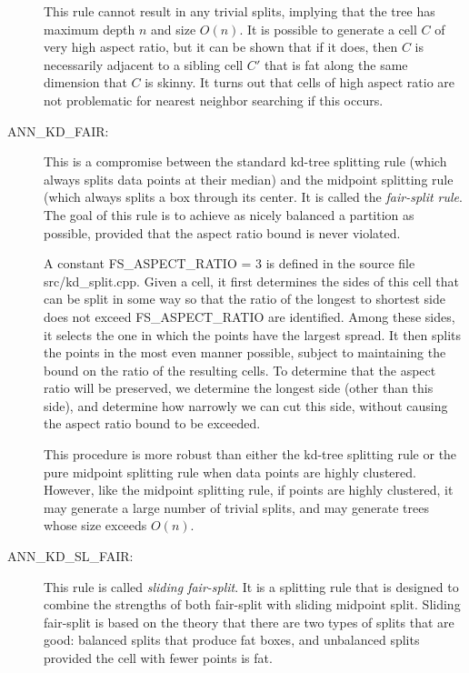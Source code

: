 \documentclass[11pt]{article}		%
\begin{document}
\begin{description}
	This rule cannot result in any trivial splits, implying that the
	tree has maximum depth $n$ and size $O(n)$.  It is possible to
	generate a cell $C$ of very high aspect ratio, but it can be shown
	that if it does, then $C$ is necessarily adjacent to a sibling cell
	$C'$ that is fat along the same dimension that $C$ is skinny.  It
	turns out that cells of high aspect ratio are not problematic for
	nearest neighbor searching if this occurs.

\item[\hbox{\sf ANN\_KD\_FAIR:}]
	This is a compromise between the standard kd-tree
	splitting rule (which always splits data points at their median)
	and the midpoint splitting rule (which always splits a box through
	its center.  It is called the \emph{fair-split rule}.  The goal of
	this rule is to achieve as nicely balanced a partition as possible,
	provided that the aspect ratio bound is never violated.

	A constant \textsf{FS\_ASPECT\_RATIO = 3} is defined in the source
	file \textsf{src/kd\_split.cpp}.  Given a cell, it first determines
	the sides of this cell that can be split in some way so that the
	ratio of the longest to shortest side does not exceed
	\textsf{FS\_ASPECT\_RATIO} are identified.  Among these sides, it
	selects the one in which the points have the largest spread.  It
	then splits the points in the most even manner possible, subject
	to maintaining the bound on the ratio of the resulting cells.  To
	determine that the aspect ratio will be preserved, we determine
	the longest side (other than this side), and determine how narrowly
	we can cut this side, without causing the aspect ratio bound to
	be exceeded.

	This procedure is more robust than either the kd-tree splitting rule
	or the pure midpoint splitting rule when data points are highly
	clustered.  However, like the midpoint splitting rule, if points
	are highly clustered, it may generate a large number of trivial
	splits, and may generate trees whose size exceeds $O(n)$.

\item[\hbox{\sf ANN\_KD\_SL\_FAIR:}]
	This rule is called \emph{sliding fair-split}.  It is a splitting rule
	that is designed to combine the strengths of both fair-split with
	sliding midpoint split.  Sliding fair-split is based on the theory
	that there are two types of splits that are good: balanced splits
	that produce fat boxes, and unbalanced splits provided the cell
	with fewer points is fat.


\end{description}
\end{document}
